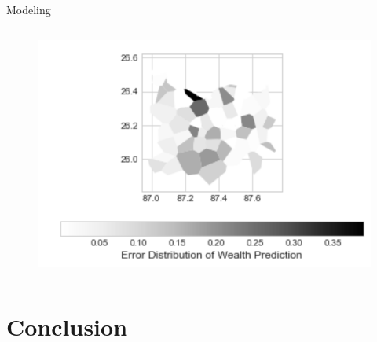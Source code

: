 \documentclass[t]{beamer}
\begin{document}
\begin{frame}{Modeling}
	\begin{columns}[T,totalwidth=\textwidth]
            \begin{figure}
				\vspace{-\blocktitlesize}
				\includegraphics[height=0.65\paperheight,keepaspectratio]{images/diff.png}
			\end{figure}
  	\end{columns}
\end{frame}

\section{Conclusion}
\end{document}
